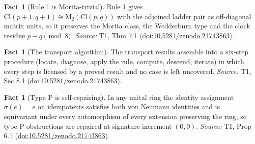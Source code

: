 \documentclass[11pt]{article}
\theoremstyle{definition}
\newtheorem{fact}[theorem]{Fact}
\theoremstyle{plain}
\providecommand{\Cl}{}\renewcommand{\Cl}{\mathrm{Cl}}
\providecommand{\Mat}{}\renewcommand{\Mat}{\mathrm{M}}
\begin{document}
\begin{fact}[Rule 1 is Morita-trivial]\label{c:transport.rule-1-morita-trivial}
Rule 1 gives $\Cl(p+1, q+1) \cong \Mat_2(\Cl(p,q))$ with the adjoined ladder pair as off-diagonal matrix units, so it preserves the Morita class, the Wedderburn type and the clock residue $p - q \pmod 8$.
\emph{Source:} T1, Thm 7.1 (\href{https://doi.org/10.5281/zenodo.21743863}{doi:10.5281/zenodo.21743863}).
\end{fact}

\begin{fact}[The transport algorithm]\label{c:transport.transport-algorithm}
The transport results assemble into a six-step procedure (locate, diagnose, apply the rule, compute, descend, iterate) in which every step is licensed by a proved result and no case is left uncovered.
\emph{Source:} T1, Sec 8.1 (\href{https://doi.org/10.5281/zenodo.21743863}{doi:10.5281/zenodo.21743863}).
\end{fact}

\begin{fact}[Type P is self-repairing]\label{c:transport.type-p-self-repairing}
In any unital ring the identity assignment $\sigma(e) = e$ on idempotents satisfies both von Neumann identities and is equivariant under every automorphism of every extension preserving the ring, so type P obstructions are repaired at signature increment $(0,0)$.
\emph{Source:} T1, Prop 6.1 (\href{https://doi.org/10.5281/zenodo.21743863}{doi:10.5281/zenodo.21743863}).
\end{fact}
\end{document}
